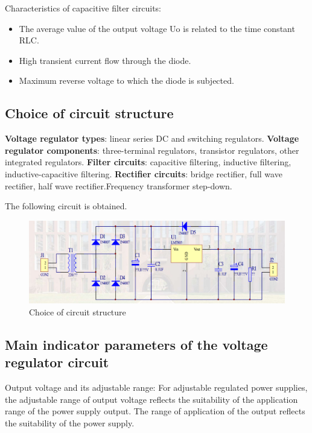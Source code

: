 \documentclass[UTF8]{article}
\begin{document}
    Characteristics of capacitive filter circuits:
    \begin{itemize}
    \item The average value of the output voltage Uo is related to the time constant RLC.
    
    \item High transient current flow through the diode.
    
    \item Maximum reverse voltage to which the diode is subjected.
    \end{itemize}
    
    \subsection{Choice of circuit structure}  
    \textbf{Voltage regulator types}: linear series DC and switching regulators.
    \textbf{Voltage regulator components}: three-terminal regulators, transistor regulators, other integrated regulators.
    \textbf{Filter circuits}: capacitive filtering, inductive filtering, inductive-capacitive filtering.
    \textbf{ Rectifier circuits}: bridge rectifier, full wave rectifier, half wave rectifier.Frequency transformer step-down.
    
    The following circuit is obtained.

    	\begin{figure}[H]
    	    	\centering
    	    	\includegraphics[clip,scale=0.8,trim={0 0 0 0}]{fig/fig13.png}
    	        \caption{Choice of circuit structure}
    	        \label{figure.13}
        \end{figure}  
        
    \subsection{Main indicator parameters of the voltage regulator circuit}
    Output voltage and its adjustable range: For adjustable regulated power supplies, the adjustable range of output voltage reflects the suitability of the application range of the power supply output. The range of application of the output reflects the suitability of the power supply.
    
\end{document}
